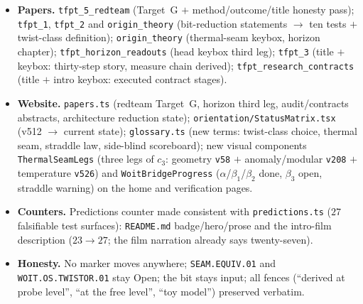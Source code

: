 \documentclass[11pt]{article}
\providecommand{\vref}[1]{\texttt{#1}}
\begin{document}
\begin{itemize}[leftmargin=1.5em]
\item \textbf{Papers.} \texttt{tfpt\_5\_redteam} (Target~G $+$ method/outcome/title honesty pass);
\texttt{tfpt\_1}, \texttt{tfpt\_2} and \texttt{origin\_theory} (bit-reduction statements $\to$ ten
tests $+$ twist-class definition); \texttt{origin\_theory} (thermal-seam keybox, horizon chapter);
\texttt{tfpt\_horizon\_readouts} (head keybox third leg); \texttt{tfpt\_3} (title $+$ keybox:
thirty-step story, measure chain derived); \texttt{tfpt\_research\_contracts} (title $+$ intro keybox:
executed contract stages).
\item \textbf{Website.} \texttt{papers.ts} (redteam Target~G, horizon third leg, audit/contracts
abstracts, architecture reduction state); \texttt{orientation/StatusMatrix.tsx} (v512 $\to$ current state);
\texttt{glossary.ts} (new terms: twist-class choice, thermal seam, straddle law, side-blind scoreboard);
new visual components \texttt{ThermalSeamLegs} (three legs of $c_3$: geometry \vref{v58} $+$
anomaly/modular \vref{v208} $+$ temperature \vref{v526}) and \texttt{WoitBridgeProgress}
($\alpha$/$\beta_1$/$\beta_2$ done, $\beta_3$ open, straddle warning) on the home and verification pages.
\item \textbf{Counters.} Predictions counter made consistent with \texttt{predictions.ts} ($27$
falsifiable test surfaces): \texttt{README.md} badge/hero/prose and the intro-film description
($23\to27$; the film narration already says twenty-seven).
\item \textbf{Honesty.} No marker moves anywhere; \texttt{SEAM.EQUIV.01} and
\texttt{WOIT.OS.TWISTOR.01} stay Open; the bit stays input; all fences (``derived at probe level'',
``at the free level'', ``toy model'') preserved verbatim.
\end{itemize}
\end{document}
